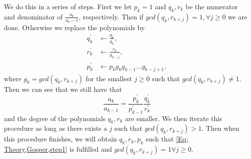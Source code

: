 We do this in a series of steps. First we let $p_k=1$ and $q_k, r_k$ be the numerator and denominator of $\frac{a_k}{a_k-1}$, respectively. Then if $gcd(q_k,r_{k+j})=1, \forall j\geq 0$ we are done. Otherwise we replace the polynomials by
\begin{equation}
  \begin{split}
    q_k^\prime & \leftarrow \frac{q_k}{g_k}, \\
    r_k^\prime & \leftarrow \frac{r_k}{g_{k-j}}, \\
    p_k^\prime & \leftarrow p_kg_kg_{k-1}\ldots g_{k-j+1},
  \end{split}
\end{equation}
where $g_k=gcd(q_k,r_{k+j})$ for the smallest $j\geq 0$ such that $gcd(q_k,r_{k+j})\neq 1$. Then we can see that we still have that
\begin{equation}
  \frac{a_k}{a_{k-1}} = \frac{p_k^\prime}{p_{k-1}^\prime}\frac{q_k^\prime}{r_k^\prime}
\end{equation}
and the degree of the polynomials $q_k, r_k$ are smaller. We then iterate this procedure as long as there exists a $j$ such that $gcd(q_k,r_{k+j})>1$. Then when this procedure finishes, we will obtain $q_k,r_k,p_k$ such that \ref{Eq: Theory,Gosper,step1} is fulfilled and $gcd(q_k,r_{k+j})=1 \forall j\geq 0$.

